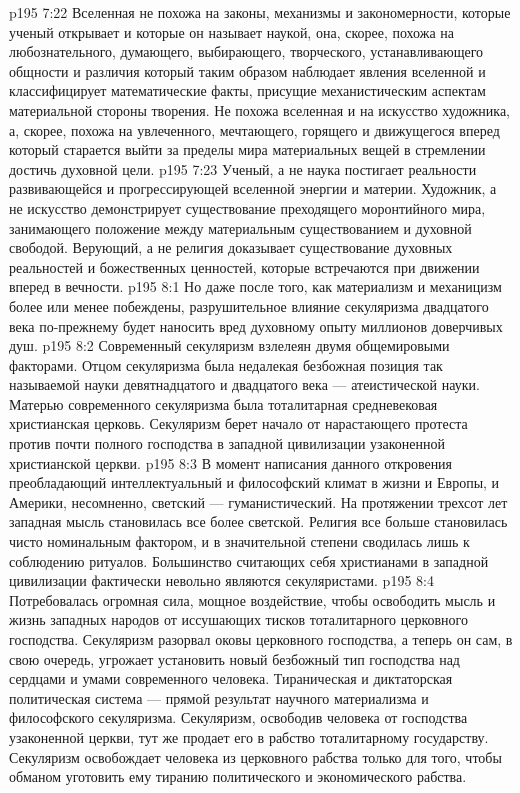 \vs p195 7:22 Вселенная не похожа на законы, механизмы и закономерности, которые ученый открывает и которые он называет наукой, она, скорее, похожа на любознательного, думающего, выбирающего, творческого, устанавливающего общности и различия  который таким образом наблюдает явления вселенной и классифицирует математические факты, присущие механистическим аспектам материальной стороны творения. Не похожа вселенная и на искусство художника, а, скорее, похожа на увлеченного, мечтающего, горящего и движущегося вперед  который старается выйти за пределы мира материальных вещей в стремлении достичь духовной цели.
\vs p195 7:23 Ученый, а не наука постигает реальности развивающейся и прогрессирующей вселенной энергии и материи. Художник, а не искусство демонстрирует существование преходящего моронтийного мира, занимающего положение между материальным существованием и духовной свободой. Верующий, а не религия доказывает существование духовных реальностей и божественных ценностей, которые встречаются при движении вперед в вечности.
\vs p195 8:1 Но даже после того, как материализм и механицизм более или менее побеждены, разрушительное влияние секуляризма двадцатого века по\hyp{}прежнему будет наносить вред духовному опыту миллионов доверчивых душ.
\vs p195 8:2 Современный секуляризм взлелеян двумя общемировыми факторами. Отцом секуляризма была недалекая безбожная позиция так называемой науки девятнадцатого и двадцатого века --- атеистической науки. Матерью современного секуляризма была тоталитарная средневековая христианская церковь. Секуляризм берет начало от нарастающего протеста против почти полного господства в западной цивилизации узаконенной христианской церкви.
\vs p195 8:3 В момент написания данного откровения преобладающий интеллектуальный и философский климат в жизни и Европы, и Америки, несомненно, светский --- гуманистический. На протяжении трехсот лет западная мысль становилась все более светской. Религия все больше становилась чисто номинальным фактором, и в значительной степени сводилась лишь к соблюдению ритуалов. Большинство считающих себя христианами в западной цивилизации фактически невольно являются секуляристами.
\vs p195 8:4 Потребовалась огромная сила, мощное воздействие, чтобы освободить мысль и жизнь западных народов от иссушающих тисков тоталитарного церковного господства. Секуляризм разорвал оковы церковного господства, а теперь он сам, в свою очередь, угрожает установить новый безбожный тип господства над сердцами и умами современного человека. Тираническая и диктаторская политическая система --- прямой результат научного материализма и философского секуляризма. Секуляризм, освободив человека от господства узаконенной церкви, тут же продает его в рабство тоталитарному государству. Секуляризм освобождает человека из церковного рабства только для того, чтобы обманом уготовить ему тиранию политического и экономического рабства.
